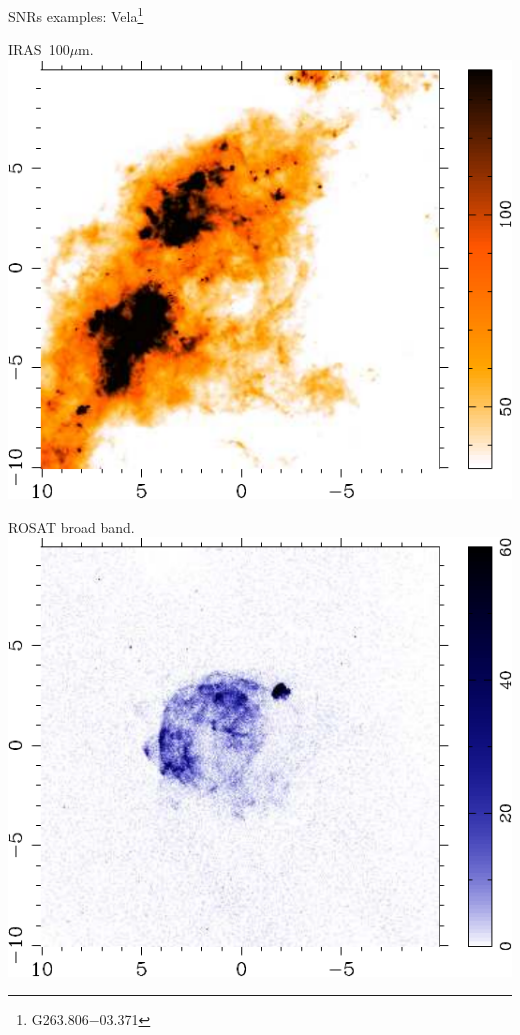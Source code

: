 \begin{frame}{SNRs examples: Vela\footnote{G263.806$-$03.371}}


\begin{minipage}[t]{0.49\textwidth}
  \begin{center}
IRAS~100$\mu$m.
    \includegraphics[width=\textwidth,height=!]{./E/VelaX_100um.pdf}
    \end{center}
\end{minipage}
\begin{minipage}[t]{0.49\textwidth}
  \begin{center}
ROSAT broad band.
    \includegraphics[width=\textwidth,height=!]{./E/VelaX_RASS_broad.pdf}
    \end{center}
\end{minipage}

\end{frame}



